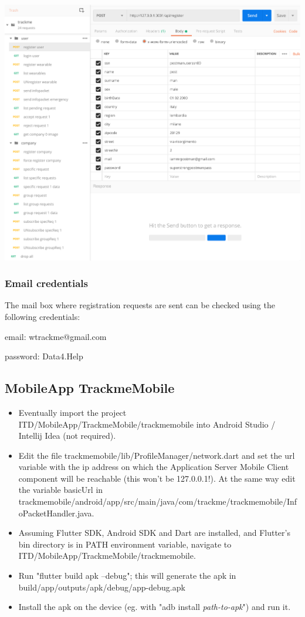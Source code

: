 \documentclass[../main.tex]{subfiles}
\begin{document}
\includegraphics[width = \linewidth ]{images/postman_screen.png}

\subsubsection{Email credentials}
The mail box where registration requests are sent can be checked using the following credentials:
\begin{description}
	\item email: wtrackme@gmail.com
	\item password: Data4.Help
\end{description}


\subsection{MobileApp TrackmeMobile}

\begin{itemize}
	\item Eventually import the project ITD/MobileApp/TrackmeMobile/trackmemobile into Android Studio / Intellij Idea (not required).
	\item Edit the file trackmemobile/lib/ProfileManager/network.dart and set the \textunderscore url variable with the ip address on which the Application Server Mobile Client component will be reachable (this won't be 127.0.0.1!). At the same way edit the variable basicUrl in trackmemobile/android/app/src/main/java/com/trackme/trackmemobile/InfoPacketHandler.java.
	\item Assuming Flutter SDK, Android SDK and Dart are installed, and Flutter's bin directory is in PATH environment variable, navigate to ITD/MobileApp/TrackmeMobile/trackmemobile.
	\item Run "flutter build apk --debug"; this will generate the apk in build/app/outputs/apk/debug/app-debug.apk
	\item Install the apk on the device (eg. with "adb install \textit{path-to-apk}") and run it.
\end{itemize}
\end{document}

